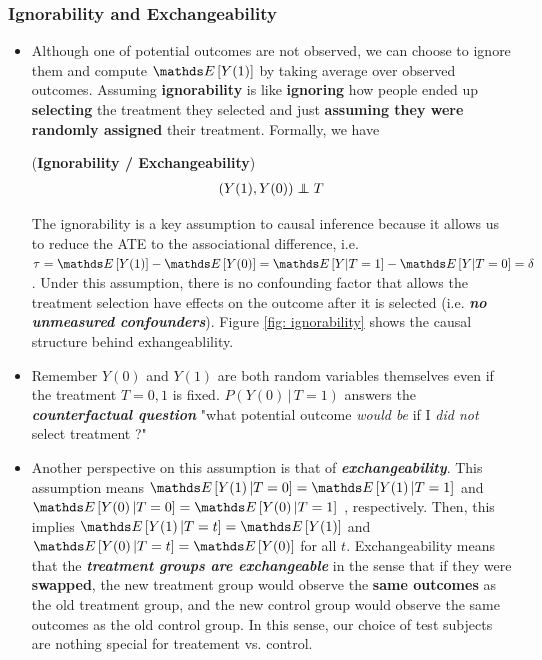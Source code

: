 \documentclass[11pt]{article}
\begin{document}
\subsubsection{Ignorability and Exchangeability}
\begin{itemize}
\item Although one of potential outcomes are not observed, we can choose to ignore them and compute $ \E{}{Y(1)}$ by taking average over observed outcomes. Assuming \textbf{ignorability} is like \textbf{ignoring} how people ended up \textbf{selecting} the treatment they selected and just \textbf{assuming they were randomly assigned} their treatment. Formally, we have
\begin{assumption} (\textbf{Ignorability / Exchangeability}) \citep{neal2020introduction}
\begin{align}
(Y(1), Y(0)) \indep T  \label{eqn: Ignorability}
\end{align}
\end{assumption}The ignorability is a key assumption to causal inference because it allows us to reduce the ATE to the associational difference, i.e. $\tau = \E{}{Y(1)} -\E{}{Y(0)} = \E{}{Y| T = 1} - \E{}{Y| T = 0} = \delta$. Under this assumption, there is no confounding factor that allows the treatment selection have effects on the outcome after it is selected (i.e. \emph{\textbf{no unmeasured confounders}}). Figure \ref{fig: ignorability} shows the causal structure behind exhangeablility. 

\item Remember $Y(0)$ and $Y(1)$ are both random variables themselves even if the treatment $T=0,1$ is fixed. $P(Y(0)\,|\,T=1)$ answers the \emph{\textbf{counterfactual question}} "what potential outcome \emph{would be} if I \emph{did not} select treatment ?"

\item Another perspective on this assumption is that of \emph{\textbf{exchangeability}}. This assumption means $\E{}{Y(1)\,| T = 0}=\E{}{Y(1)\,| T = 1}$
and $\E{}{Y(0)\,| T = 0}=\E{}{Y(0)\,| T = 1}$ , respectively. Then, this implies $\E{}{Y(1)\,| T = t}=\E{}{Y(1)}$  and $\E{}{Y(0)\,| T = t}=\E{}{Y(0)}$ for all $t$. Exchangeability means that the \textbf{\emph{treatment groups are exchangeable}} in the sense that if they were \textbf{swapped}, the new treatment group would observe the \textbf{same outcomes} as the old treatment group, and the new control group would observe the same outcomes as the old control group. In this sense, our choice of test subjects are nothing special for treatement vs. control. 


\end{itemize}
\end{document}
